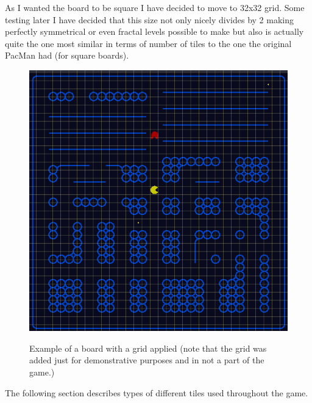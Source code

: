\documentclass[11pt,a4paper,notitlepage]{report}
\newenvironment{img}{
	\begin{center}
		\begin{figure}[H]
			\begin{center}
			
}{
	\end{center}
		\end{figure}
			\end{center}
}
\begin{document}
			As I wanted the board to be square I have decided to move to 32x32 grid. Some testing later I have decided that this size not only nicely divides by 2 making perfectly symmetrical or even fractal levels possible to make but also is actually quite the one most similar in terms of number of tiles to the one the original PacMan had (for square boards).
			\begin{img}
				\includegraphics[width=350pt]{images/board_grid}\\
				\caption{Example of a board with a grid applied (note that the grid was added just for demonstrative purposes and in not a part of the game.)}
			\end{img}
			The following section describes types of different tiles used throughout the game.
\end{document}
